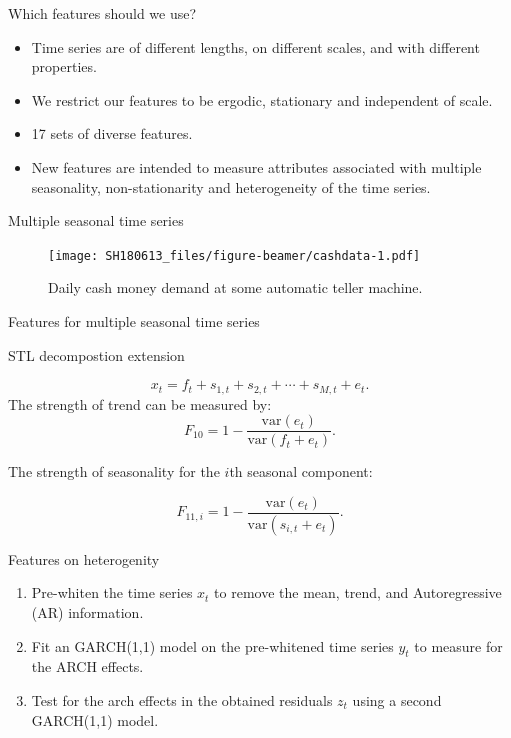\documentclass[11pt,ignorenonframetext,compress]{beamer}
\providecommand{\tightlist}{%
  \setlength{\itemsep}{0pt}\setlength{\parskip}{0pt}}
\begin{document}
\begin{frame}{Which features should we use?}

  \begin{itemize}
    \tightlist
  \item
    Time series are of different lengths, on different scales, and with
    different properties.
  \item
    We restrict our features to be ergodic, stationary and independent of
    scale.
  \item
    17 sets of diverse features.
  \item
    New features are intended to measure attributes associated with
    multiple seasonality, non-stationarity and heterogeneity of the time
    series.
  \end{itemize}

\end{frame}

\begin{frame}{Multiple seasonal time series}

  \begin{figure}
    \centering
    \texttt{[image: SH180613\_files/figure-beamer/cashdata-1.pdf]}
    \caption{Daily cash money demand at some automatic teller machine.}
  \end{figure}

\end{frame}

\begin{frame}{Features for multiple seasonal time series}

  \begin{block}{STL decompostion extension}

    \[ x_t = f_t + s_{1,t} + s_{2,t} + \cdots + s_{M,t} + e_t.\] The
    strength of trend can be measured by: \[
      F_{10} = 1- \frac{\text{var}(e_t)}{\text{var}(f_t + e_t)}.
    \]

    The strength of seasonality for the \(i\)th seasonal component:

    \[
      F_{11,i} = 1- \frac{\text{var}(e_t)}{\text{var}(s_{i,t} + e_t)}.
    \]

  \end{block}

\end{frame}

\begin{frame}{Features on heterogenity}

  \begin{enumerate}
    \def\labelenumi{\arabic{enumi}.}
    \tightlist
  \item
    Pre-whiten the time series \(x_t\) to remove the mean, trend, and
    Autoregressive (AR) information.
  \item
    Fit an GARCH(1,1) model on the pre-whitened time series \(y_t\) to
    measure for the ARCH effects.
  \item
    Test for the arch effects in the obtained residuals \(z_t\) using a
    second GARCH(1,1) model.
  \end{enumerate}

\end{frame}
\end{document}

